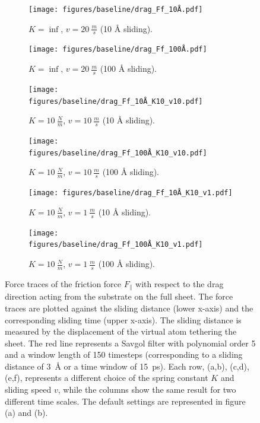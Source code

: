 \begin{figure}[H]
  \centering
  \begin{subfigure}[t]{0.49\textwidth}
      \centering
      \texttt{[image: figures/baseline/drag\_Ff\_10Å.pdf]}
      \caption{$K = \inf$, $v = \SI{20}{\frac{m}{s}}$ (10 Å sliding).}
      \label{fig:drag_Ff_10}
  \end{subfigure}
  \hfill
  \begin{subfigure}[t]{0.49\textwidth}
      \centering
      \texttt{[image: figures/baseline/drag\_Ff\_100Å.pdf]}
      \caption{$K = \inf$, $v = \SI{20}{\frac{m}{s}}$ (100 Å sliding).}
      \label{fig:drag_Ff_100}
    \end{subfigure}
    \hfill
    \begin{subfigure}[t]{0.49\textwidth}
      \centering
      \texttt{[image: figures/baseline/drag\_Ff\_10Å\_K10\_v10.pdf]}
      \caption{$K = \SI{10}{\frac{N}{m}}$, $v = \SI{10}{\frac{m}{s}}$ (10 Å sliding).}
      \label{fig:drag_Ff_10_K10_v10}
    \end{subfigure}
    \hfill
    \begin{subfigure}[t]{0.49\textwidth}
      \centering
      \texttt{[image: figures/baseline/drag\_Ff\_100Å\_K10\_v10.pdf]}
      \caption{$K = \SI{10}{\frac{N}{m}}$, $v = \SI{10}{\frac{m}{s}}$ (100 Å sliding).}
      \label{fig:drag_Ff_100_K10_v10}
  \end{subfigure}
  \hfill
    \begin{subfigure}[t]{0.49\textwidth}
      \centering
      \texttt{[image: figures/baseline/drag\_Ff\_10Å\_K10\_v1.pdf]}
      \caption{$K = \SI{10}{\frac{N}{m}}$, $v = \SI{1}{\frac{m}{s}}$ (10 Å sliding).}
      \label{fig:drag_Ff_10_K10_v1}
    \end{subfigure}
    \hfill
    \begin{subfigure}[t]{0.49\textwidth}
      \centering
      \texttt{[image: figures/baseline/drag\_Ff\_100Å\_K10\_v1.pdf]}
      \caption{$K = \SI{10}{\frac{N}{m}}$, $v = \SI{1}{\frac{m}{s}}$ (100 Å sliding).}
      \label{fig:drag_Ff_100_K10_v1}
  \end{subfigure}
  \hfill
     \caption{Force traces of the friction force $F_\parallel$ with respect to the drag direction acting from the substrate on the full sheet. The force traces are plotted against the sliding distance (lower x-axis) and the corresponding sliding time (upper x-axis). The sliding distance is measured by the displacement of the virtual atom tethering the sheet. The red line represents a Savgol filter with polynomial order 5 and a window length of 150 timesteps (corresponding to a sliding distance of \SI{3}{Å} or a time window of \SI{15}{ps}). Each row, (a,b), (c,d), (e,f), represents a different choice of the spring constant $K$ and sliding speed $v$, while the columns show the same result for two different time scales. The default settings are represented in figure (a) and (b).}
     \label{fig:drag_Ff}
\end{figure}


